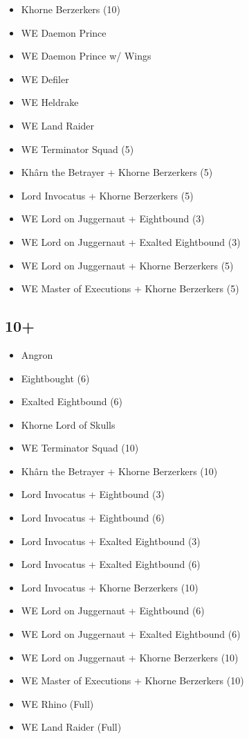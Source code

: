 \documentclass{HordeModeTarot}
\begin{document}
\begin{multicols}{2}
\begin{itemize}[leftmargin=*]
\item[] Khorne Berzerkers (10)
\item[] WE Daemon Prince
\item[] WE Daemon Prince w/ Wings
\item[] WE Defiler
\item[] WE Heldrake
\item[] WE Land Raider
\item[] WE Terminator Squad (5)
\item[] Khârn the Betrayer + Khorne Berzerkers (5)
\item[] Lord Invocatus + Khorne Berzerkers (5)
\item[] WE Lord on Juggernaut + Eightbound (3)
\item[] WE Lord on Juggernaut + Exalted Eightbound (3)
\item[] WE Lord on Juggernaut + Khorne Berzerkers (5)
\item[] WE Master of Executions + Khorne Berzerkers (5)
\end{itemize}

\subsection*{10+}

\begin{itemize}[leftmargin=*]
\item[] Angron
\item[] Eightbought (6)
\item[] Exalted Eightbound (6)
\item[] Khorne Lord of Skulls
\item[] WE Terminator Squad (10)
\item[] Khârn the Betrayer + Khorne Berzerkers (10)
\item[] Lord Invocatus + Eightbound (3)
\item[] Lord Invocatus + Eightbound (6)
\item[] Lord Invocatus + Exalted Eightbound (3)
\item[] Lord Invocatus + Exalted Eightbound (6)
\item[] Lord Invocatus + Khorne Berzerkers (10)
\item[] WE Lord on Juggernaut + Eightbound (6)
\item[] WE Lord on Juggernaut + Exalted Eightbound (6)
\item[] WE Lord on Juggernaut + Khorne Berzerkers (10)
\item[] WE Master of Executions + Khorne Berzerkers (10)
\item[] WE Rhino (Full)
\item[] WE Land Raider (Full)
\end{itemize}


\end{multicols}
\end{document}
